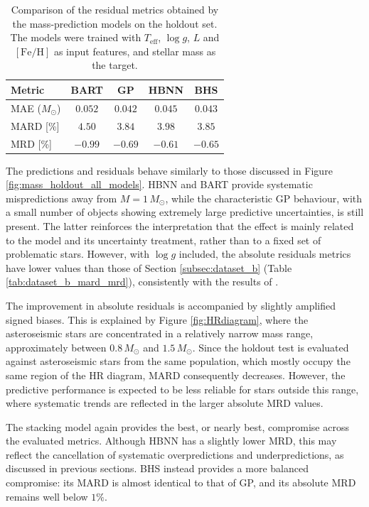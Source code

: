 \begin{table}[H]
    \centering
    \caption{Comparison of the residual metrics obtained by the mass-prediction models on the holdout set. The models were trained with $T_{\mathrm{eff}}$, $\log g$, $L$ and $[\mathrm{Fe}/\mathrm{H}]$ as input features, and stellar mass as the target.}
    \label{tab:dataset_D_model_mard_mrd}
    \begin{tabular}{lcccc}
        \hline\hline
        Metric & BART & GP & HBNN & BHS \\
        \hline
        MAE ($M_\odot$) & $0.052$ & $0.042$ & $0.045$ & $0.043$ \\
        MARD [\%] & $4.50$ & $3.84$ & $3.98$ & $3.85$ \\
        MRD [\%]  & $-0.99$ & $-0.69$ & $-0.61$ & $-0.65$ \\
        \hline
    \end{tabular}
\end{table}

The predictions and residuals behave similarly to those discussed in Figure \ref{fig:mass_holdout_all_models}. HBNN and BART provide systematic mispredictions away from $M=1\,M_\odot$, while the characteristic GP behaviour, with a small number of objects showing extremely large predictive uncertainties, is still present. The latter reinforces the interpretation that the effect is mainly related to the model and its uncertainty treatment, rather than to a fixed set of problematic stars. However, with $\log g$ included, the absolute residuals metrics have lower values than those of Section \ref{subsec:dataset_b} (Table \ref{tab:dataset_b_mard_mrd}), consistently with the results of \citet{moya2022}.

The improvement in absolute residuals is accompanied by slightly amplified signed biases. This is explained by Figure \ref{fig:HRdiagram}, where the asteroseismic stars are concentrated in a relatively narrow mass range, approximately between $0.8\,M_\odot$ and $1.5\,M_\odot$. Since the holdout test is evaluated against asteroseismic stars from the same population, which mostly occupy the same region of the HR diagram, MARD consequently decreases. However, the predictive performance is expected to be less reliable for stars outside this range, where systematic trends are reflected in the larger absolute MRD values.

The stacking model again provides the best, or nearly best, compromise across the evaluated metrics. Although HBNN has a slightly lower MRD, this may reflect the cancellation of systematic overpredictions and underpredictions, as discussed in previous sections. BHS instead provides a more balanced compromise: its MARD is almost identical to that of GP, and its absolute MRD remains well below $1\%$.

